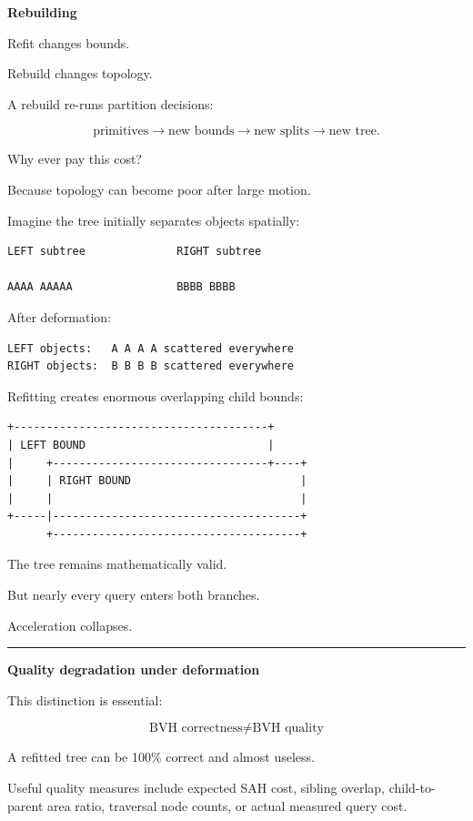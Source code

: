 \textbf{Rebuilding}

Refit changes bounds.

Rebuild changes topology.

A rebuild re-runs partition decisions:

\[
\text{primitives}
\rightarrow
\text{new bounds}
\rightarrow
\text{new splits}
\rightarrow
\text{new tree}.
\]

Why ever pay this cost?

Because topology can become poor after large motion.

Imagine the tree initially separates objects spatially:

\begin{verbatim}
LEFT subtree              RIGHT subtree

AAAA AAAAA                BBBB BBBB
\end{verbatim}

After deformation:

\begin{verbatim}
LEFT objects:   A A A A scattered everywhere
RIGHT objects:  B B B B scattered everywhere
\end{verbatim}

Refitting creates enormous overlapping child bounds:

\begin{verbatim}
+---------------------------------------+
| LEFT BOUND                            |
|     +---------------------------------+----+
|     | RIGHT BOUND                          |
|     |                                      |
+-----|--------------------------------------+
      +--------------------------------------+
\end{verbatim}

The tree remains mathematically valid.

But nearly every query enters both branches.

Acceleration collapses.

\begin{center}\rule{0.5\linewidth}{0.5pt}\end{center}

\textbf{Quality degradation under deformation}

This distinction is essential:

\[
\boxed{
\text{BVH correctness}
\ne
\text{BVH quality}
}
\]

A refitted tree can be 100\% correct and almost useless.

Useful quality measures include expected SAH cost, sibling overlap, child-to-parent area ratio, traversal node counts, or actual measured query cost.

